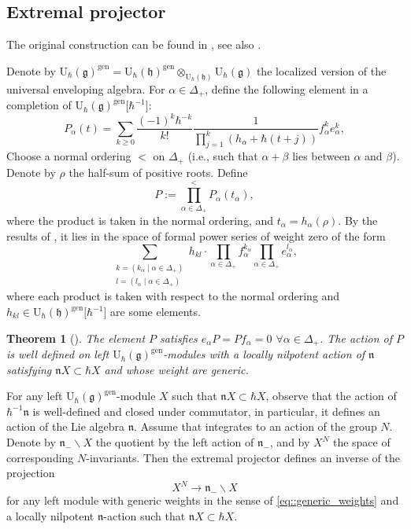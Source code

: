 \documentclass[10pt,a4paper]{article}
\numberwithin{equation}{section}
\newtheorem{Theorem}{Theorem}[section]
\newcommand{\U}{\mathrm{U}_{\hbar}}
\newcommand{\g}{\mathfrak{g}}
\newcommand{\h}{\mathfrak{h}}
\newcommand{\n}{\mathfrak{n}}
\newcommand{\gen}{\mathrm{gen}}
\begin{document}
	\subsection{Extremal projector}
	\label{subsect::extremal_proj}
	
	The original construction can be found in \cite{AsherovaSmirnovTolstoy}, see also \cite{ZhelobenkoSalgebras}.
	
	Denote by $\U(\g)^{\gen} = \U (\h)^{\gen} \otimes_{\U(\h)} \U(\g)$ the localized version of the universal enveloping algebra. For $\alpha\in \Delta_+$, define the following element in a completion of $\U(\g)^{\gen}\bigl[\hbar^{-1}\bigr]$:
	\begin{equation}
		\label{eq::extremal_proj_term}
		P_{\alpha}(t) = \sum\limits_{k\geq 0} \frac{(-1)^k \hbar^{-k}}{k!} \frac{1}{\prod_{j=1}^k (h_{\alpha} + \hbar(t+j))} f_{\alpha}^k e_{\alpha}^k,
	\end{equation}
	Choose a normal ordering $<$ on $\Delta_+$ (i.e., such that $\alpha + \beta$ lies between $\alpha$ and $\beta$). Denote by $\rho$ the half-sum of positive roots. Define
	\begin{equation}
		\label{eq::extremal_proj}
		P := \prod_{\alpha \in \Delta_+}^{<} P_{\alpha}(t_{\alpha}),
	\end{equation}
	where the product is taken in the normal ordering, and $t_{\alpha} = h_{\alpha}(\rho)$. By the results of \cite{ZhelobenkoCocycles}, it lies in the space of formal power series of weight zero of the form
	\[
	\sum\limits_{\substack{k = (k_{\alpha} \mid \alpha\in \Delta_+) \\ l = (l_{\alpha} \mid \alpha\in \Delta_+)}} h_{kl} \cdot \prod_{\alpha \in \Delta_+} f_{\alpha}^{k_{\alpha}} \prod_{\alpha \in \Delta_+} e_{\alpha}^{l_{\alpha}},
	\]
	where each product is taken with respect to the normal ordering and $h_{kl} \in \U(\h)^{\gen}\bigl[\hbar^{-1}\bigr]$ are some elements.
	
	\begin{Theorem}[{\cite{AsherovaSmirnovTolstoy}}]
		\label{thm::extremal_proj}
		The element $P$ satisfies
$
		e_{\alpha} P = P f_{\alpha} = 0 $ $\forall \alpha \in \Delta_+$.
		The action of $P$ is well defined on left $\U(\g)^{\gen}$-modules with a locally nilpotent action of $\n$ satisfying $\n X \subset \hbar X$ and whose weight are generic.
	\end{Theorem}
	
	For any left $\U(\g)^{\gen}$-module $X$ such that $\n X \subset \hbar X$, observe that the action of $\hbar^{-1} \n$ is well-defined and closed under commutator, in particular, it defines an action of the Lie algebra $\n$. Assume that integrates to an action of the group $N$. Denote by $\n_- \backslash X$ the quotient by the left action of $\n_-$, and by $X^{N}$ the space of corresponding $N$-invariants. Then the extremal projector defines an inverse of the projection
	\begin{equation}
		\label{eq::extremal_proj_iso_inv_quot}
		X^{N} \rightarrow \n_- \backslash X
	\end{equation}
	for any left module with generic weights in the sense of \eqref{eq::generic_weights} and a locally nilpotent $\n$-action such that $\n X \subset \hbar X$.
	
\end{document}

